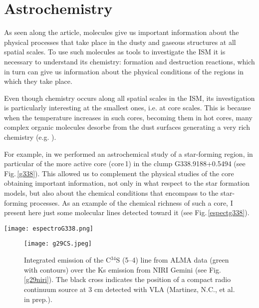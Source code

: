 \documentclass[baaa]{baaa}
\begin{document}
\section{Astrochemistry}

As seen along the article, molecules give us important information about the physical processes that take place in the dusty and gaseous structures at all spatial scales. To use such molecules as tools to investigate the ISM it is necessary to understand its chemistry: formation and destruction reactions, which in turn can give us information about the physical conditions of the regions in which they take place.  

Even though chemistry occurs along all spatial scales in the ISM, its investigation is particularly interesting at the smallest ones, i.e. at core scales. This is because when the temperature increases in such cores, becoming them in hot cores, many complex organic molecules desorbe from the dust surfaces generating a very rich chemistry (e.g. \citealt{busch22}). 

For example, in \citet{ortega23} we performed an astrochemical study of a star-forming region, in particular of the more active core (core\,1) in 
the clump G338.9188+0.5494 (see Fig.\,\ref{g338}). This allowed us to complement the physical studies of the core obtaining important information, not only in what respect to the star formation models, but also about the chemical conditions that encompass to the star-forming processes. As an example of the chemical richness of such a core, I present here just some molecular lines detected toward it (see Fig.\,\ref{espectg338}).

\begin{figure*}[h]
\centering
\texttt{[image: espectroG338.png]}
\caption{Molecular lines identified in the spectral window spw3 of ALMA data in Band\,6 toward core\,1 (C1) in the G338.9188+0.5494 region (see Fig.\,\ref{g338}). Image extracted from \citet{ortega23}.
}
\label{espectg338}
\end{figure*}


\begin{figure}[h]
\centering
\texttt{[image: g29CS.jpeg]}
\caption{Integrated emission of the C$^{34}$S (5--4) line from ALMA data (green with contours) over the Ks emission from NIRI Gemini (see Fig.\,\ref{g29niri}). The black cross indicates the position of a compact radio continuum source at 3 cm detected with VLA (Martinez, N.C., et al. in prep.). 
}
\label{CSg29}
\end{figure}
\end{document}
